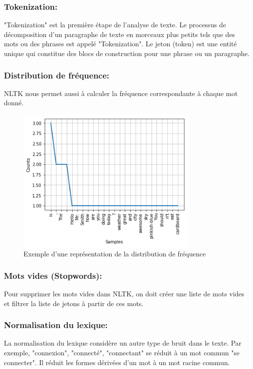 \subsubsection{Tokenization:}
"Tokenization" est la première étape de l'analyse de texte. Le processus de décomposition d'un paragraphe de texte en morceaux plus petits tels que des mots ou des phrases est appelé "Tokenization". Le jeton (token) est une entité unique qui constitue des blocs de construction pour une phrase ou un paragraphe.
\subsubsection{Distribution de fréquence:}
NLTK nous permet aussi à calculer la fréquence correspondante à chaque mot donné.
\begin{figure}[H]
    \centering
    \includegraphics[width=0.8\textwidth]{realisation/assets/nltk-freq.png}
    \caption{Exemple d'une représentation de la distribution de fréquence}
    \label{fig:my_label}
\end{figure}
\subsubsection{Mots vides (Stopwords):}
Pour supprimer les mots vides dans NLTK, on doit créer une liste de mots vides et filtrer la liste de jetons à partir de ces mots.
\subsubsection{Normalisation du lexique:}
La normalisation du lexique considère un autre type de bruit dans le texte. Par exemple, "connexion", "connecté", "connectant" se réduit à un mot commun "se connecter". Il réduit les formes dérivées d'un mot à un mot racine commun.
